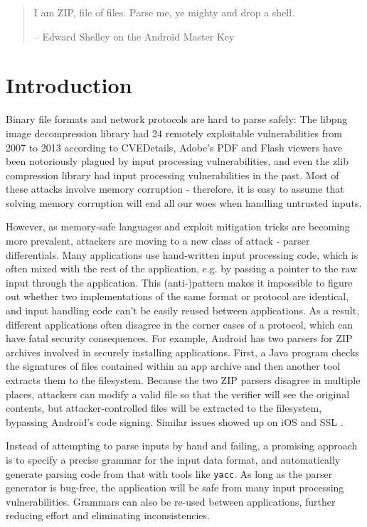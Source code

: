 \begin{quote}
  I am ZIP, file of files.
  Parse me, ye mighty and drop a shell.

  -- Edward Shelley on the Android Master Key
\end{quote}
\section{Introduction}
Binary file formats and network protocols are hard to parse safely: 
The libpng image decompression library had 24 remotely
exploitable vulnerabilities from 2007 to 2013 according to CVEDetails,
Adobe's PDF and Flash viewers have been notoriously plagued by input
processing vulnerabilities, and even the zlib compression library had
input processing vulnerabilities in the past.
Most of these attacks involve memory corruption - therefore, it is easy to assume that 
solving memory corruption will end all our woes when handling untrusted inputs. 

However, as memory-safe languages and exploit mitigation  tricks are becoming more prevalent,
attackers are moving to a new class of attack - parser differentials. Many applications use
hand-written input processing code, which is often mixed with the rest of the application, e.g. by
passing a pointer to the raw input through the application. This (anti-)pattern makes it impossible
to figure out whether two implementations of the same format or protocol are identical, and input
handling code can't be easily reused between applications. As a result, different applications often
disagree in the corner cases of a protocol, which can have fatal security consequences. For example,
Android has two parsers for ZIP archives involved in securely installing applications. First, a Java
program checks the signatures of files contained within an app archive and then another tool
extracts them to the filesystem. Because the two ZIP parsers disagree in multiple places, attackers
can modify a valid file so that the verifier will see the original contents, but attacker-controlled
files will be extracted to the filesystem, bypassing Android's code signing. Similar issues showed
up on iOS \cite{geohot-evasion} and SSL \cite{DBLP:conf/fc/KaminskyPS10}. 

Instead of attempting to parse inputs by hand and failing, 
a promising approach is to specify
a precise grammar for the input data format, and automatically generate parsing code from that with tools like {\tt yacc}. As long
as the parser generator is bug-free, the application will be safe from many
input processing vulnerabilities. Grammars can also be re-used between
applications, further reducing effort and eliminating inconsistencies.

